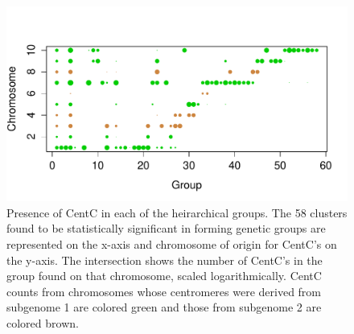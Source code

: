 {\begin{figure}[h]
\centering
\includegraphics[width=1\textwidth]{Rplot02}
\caption{Presence of CentC in each of the heirarchical groups.  The 58 clusters found to be statistically significant in forming genetic groups are represented on the x-axis and chromosome of origin for CentC's on the y-axis. The intersection shows the number of CentC's in the group found on that chromosome, scaled logarithmically.  CentC counts from chromosomes whose centromeres were derived from subgenome 1 are colored green and those from subgenome 2 are colored brown. 
}
\label{pcoa}    
\end{figure}

}
